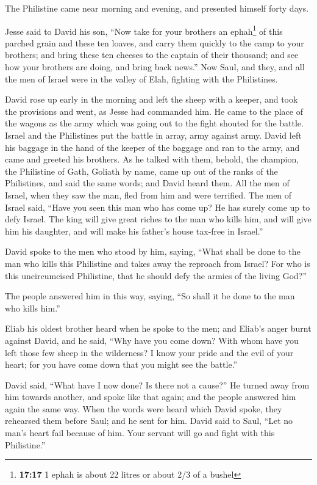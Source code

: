  The Philistine came near morning and evening, and
presented himself forty days.

 Jesse said to David his son, ``Now take for your
brothers an ephah\footnote{\textbf{17:17} 1 ephah is about 22 litres or
  about 2/3 of a bushel} of this parched grain and these ten loaves, and
carry them quickly to the camp to your brothers;  and
bring these ten cheeses to the captain of their thousand; and see how
your brothers are doing, and bring back news.''  Now
Saul, and they, and all the men of Israel were in the valley of Elah,
fighting with the Philistines.

 David rose up early in the morning and left the sheep
with a keeper, and took the provisions and went, as Jesse had commanded
him. He came to the place of the wagons as the army which was going out
to the fight shouted for the battle.  Israel and the
Philistines put the battle in array, army against army. 
David left his baggage in the hand of the keeper of the baggage and ran
to the army, and came and greeted his brothers.  As he
talked with them, behold, the champion, the Philistine of Gath, Goliath
by name, came up out of the ranks of the Philistines, and said the same
words; and David heard them.  All the men of Israel, when
they saw the man, fled from him and were terrified.  The
men of Israel said, ``Have you seen this man who has come up? He has
surely come up to defy Israel. The king will give great riches to the
man who kills him, and will give him his daughter, and will make his
father's house tax-free in Israel.''

 David spoke to the men who stood by him, saying, ``What
shall be done to the man who kills this Philistine and takes away the
reproach from Israel? For who is this uncircumcised Philistine, that he
should defy the armies of the living God?''

 The people answered him in this way, saying, ``So shall
it be done to the man who kills him.''

 Eliab his oldest brother heard when he spoke to the men;
and Eliab's anger burnt against David, and he said, ``Why have you come
down? With whom have you left those few sheep in the wilderness? I know
your pride and the evil of your heart; for you have come down that you
might see the battle.''

 David said, ``What have I now done? Is there not a
cause?''  He turned away from him towards another, and
spoke like that again; and the people answered him again the same way.
 When the words were heard which David spoke, they
rehearsed them before Saul; and he sent for him.  David
said to Saul, ``Let no man's heart fail because of him. Your servant
will go and fight with this Philistine.''

